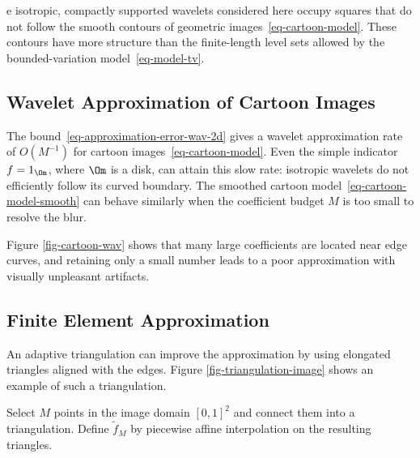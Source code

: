e isotropic, compactly supported wavelets considered here occupy squares that do not follow the smooth contours of geometric images~\eqref{eq-cartoon-model}. These contours have more structure than the finite-length level sets allowed by the bounded-variation model~\eqref{eq-model-tv}.

                                        
\subsection{Wavelet Approximation of Cartoon Images}

The bound~\eqref{eq-approximation-error-wav-2d} gives a wavelet approximation rate of $O(M^{-1})$ for cartoon images~\eqref{eq-cartoon-model}. Even the simple indicator $f=1_\Om$, where $\Om$ is a disk, can attain this slow rate: isotropic wavelets do not efficiently follow its curved boundary. The smoothed cartoon model~\eqref{eq-cartoon-model-smooth} can behave similarly when the coefficient budget $M$ is too small to resolve the blur.

Figure \ref{fig-cartoon-wav} shows that many large coefficients are located near edge curves, and retaining only a small number leads to a poor approximation with visually unpleasant artifacts.



                                        
\subsection{Finite Element Approximation}

An adaptive triangulation can improve the approximation by using elongated triangles aligned with the edges.
Figure \ref{fig-triangulation-image} shows an example of such a triangulation.


Select $M$ points in the image domain $[0,1]^2$ and connect them into a triangulation. Define $\tilde f_M$ by piecewise affine interpolation on the resulting triangles.

